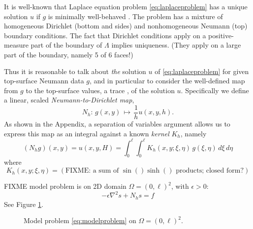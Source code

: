 \documentclass[letterpaper,final,12pt,reqno]{amsart}
\theoremstyle{cstyle}
\theoremstyle{cstyle*}
\theoremstyle{dstyle}
\newcommand{\eps}{\epsilon}
\newcommand{\grad}{\nabla}
\begin{document}
It is well-known that Laplace equation problem \eqref{eq:laplaceproblem} has a unique solution $u$ if $g$ is minimally well-behaved \cite{Elmanetal2014,Evans2010}.  The problem has a mixture of homogeneous Dirichlet (bottom and sides) and nonhomogeneous Neumann (top) boundary conditions.  The fact that Dirichlet conditions apply on a positive-measure part of the boundary of $\Lambda$ implies uniqueness.  (They apply on a large part of the boundary, namely 5 of 6 faces!)

Thus it is reasonable to talk about \emph{the} solution $u$ of \eqref{eq:laplaceproblem} for given top-surface Neumann data $g$, and in particular to consider the well-defined map from $g$ to the top-surface values, a trace \cite{Evans2010}, of the solution $u$.  Specifically we define a linear, scaled \emph{Neumann-to-Dirichlet map},
\begin{equation}
N_h : \, g(x,y) \, \mapsto \, \frac{1}{h} u(x,y,h).  \label{eq:ntod}
\end{equation}
As shown in the Appendix, a separation of variables argument allows us to express this map as an integral against a known \emph{kernel} $K_h$, namely
\begin{equation}
(N_h g)(x,y) = u(x,y,H) = \int_0^\ell \int_0^\ell K_h(x,y;\xi,\eta)\, g(\xi,\eta)\,d\xi\,d\eta  \label{eq:ntodformula}
\end{equation}
where
\begin{equation}
K_h(x,y;\xi,\eta) = (\text{FIXME: a sum of $\sin() \sinh()$ products; closed form?})  \label{eq:kernelformula}
\end{equation}

FIXME model problem is on 2D domain $\Omega = (0,\ell)^2$, with $\eps>0$:
\begin{equation}
-\eps \grad^2 s + N_h s = f  \label{eq:modelproblem}
\end{equation}
See Figure \ref{fig:modelproblem}.

\begin{figure}
\caption{Model problem \eqref{eq:modelproblem} on $\Omega = (0,\ell)^2$.}
\label{fig:modelproblem}
\end{figure}
\end{document}
